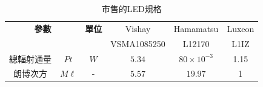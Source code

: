     \begin{table}[htpb]
        \renewcommand{\arraystretch}{1.3}
        \setlength{\arrayrulewidth}{0.15mm}
        \setlength{\doublerulesep}{0.12mm}
        \caption{市售的LED規格}
        \label{tab:para_LED}
        \centering
        \begin{tabular}{|cc|c|| c|c|c|}
        \hline
        \multicolumn{2}{|c|}{\textbf{參數}} & \textbf{單位}  
        & {Vishay}
        &{Hamamatsu}&
        Luxeon \\
        \multicolumn{2}{|c|}{} & {}  
        & {VSMA1085250\cite{datasheet:led_vsma}}
        &{L12170\cite{datasheet:hmL12170}} 
        & {L1IZ\cite{datasheet:led_luxeon}}\\
        \hline
        總輻射通量 &$Pt$ & $W$ & $5.34$ &$80\times 10^{-3}$ &1.15\\
        朗博次方& $M\ell$& -  & $5.57$ & $19.97$&1\\\hline
        \end{tabular}
    \end{table}
    
